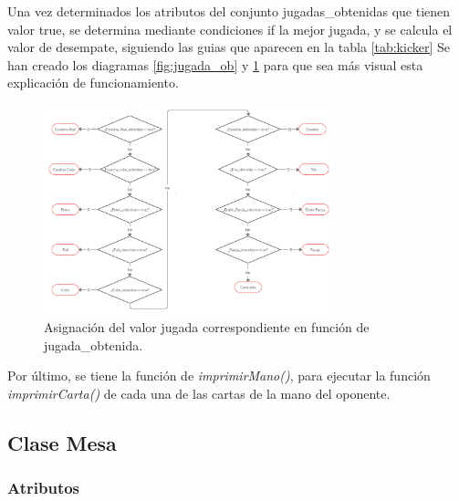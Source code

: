 Una vez determinados los atributos del conjunto jugadas\_obtenidas que tienen valor true, se determina mediante condiciones if la mejor jugada, y se calcula el valor de desempate, siguiendo las guias que aparecen en la tabla \ref{tab:kicker}
Se han creado los diagramas \ref{fig:jugada_ob} y \ref{fig:valor} para que sea más visual esta explicación de funcionamiento.


\begin{figure}[h]
\centering
\includegraphics[width=0.75\textwidth]{figuras/grafo2.png}   
\caption{Asignación del valor jugada correspondiente en función de jugada\_obtenida. \cite{propiaCreately}}
\label{fig:valor}
\end{figure}

Por último, se tiene la función de \textit{imprimirMano()}, para ejecutar la función \textit{imprimirCarta()} de cada una de las cartas de la mano del oponente.


\subsection{Clase Mesa}
\subsubsection{Atributos}

